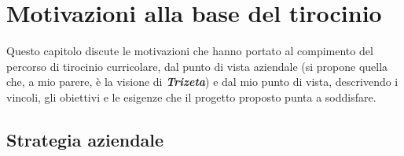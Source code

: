 
\chapter{Motivazioni alla base del tirocinio}
\label{cap:motivazioni-tirocinio}
Questo capitolo discute le motivazioni che hanno portato al compimento del percorso di tirocinio curricolare, dal punto di vista aziendale (si propone quella che, a mio parere, è la visione di \textit{\textbf{Trizeta}}) e dal mio punto di vista,
descrivendo i vincoli, gli obiettivi e le esigenze che il progetto proposto punta a soddisfare.

\section{Strategia aziendale}

